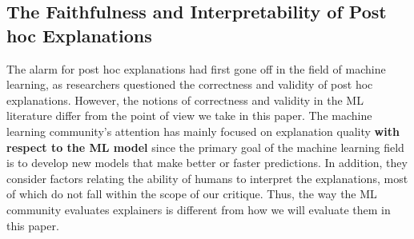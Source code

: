 \documentclass[mnsc,blindrev]{informs3}
\begin{document}
    \subsection{The Faithfulness and Interpretability of Post hoc Explanations}
        \label{sec:cs_critique}
        The alarm for post hoc explanations had first gone off in the field of machine learning, as researchers questioned the correctness and validity of post hoc explanations. However, the notions of correctness and validity in the ML literature differ from the point of view we take in this paper. The machine learning community's attention has mainly focused on explanation quality \textbf{with respect to the ML model} since the primary goal of the machine learning field is to develop new models that make better or faster predictions. In addition, they consider factors relating the ability of humans to interpret the explanations, most of which do not fall within the scope of our critique. Thus, the way the ML community evaluates explainers is different from how we will evaluate them in this paper.
\end{document}
